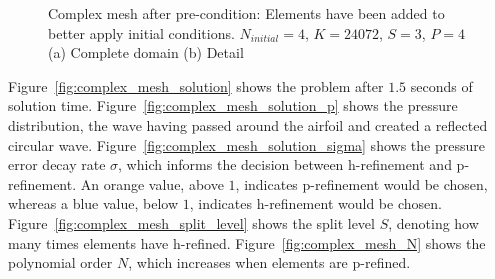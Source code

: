 \begin{figure}[H]
    \centering
    \hfill
    \caption{Complex mesh after pre-condition: Elements have been added to better apply initial 
        conditions. \(N_{initial} = 4\), \(K = 24072\), \(S = 3\), \(P = 4\) (a) Complete domain (b) 
        Detail}\label{fig:complex_mesh_pre_condition}
\end{figure}

Figure~\ref{fig:complex_mesh_solution} shows the problem after \(1.5\) seconds of solution time.
Figure~\ref{fig:complex_mesh_solution_p} shows the pressure distribution, the wave having passed
around the airfoil and created a reflected circular wave.
Figure~\ref{fig:complex_mesh_solution_sigma} shows the pressure error decay rate \(\sigma \), which
informs the decision between h-refinement and p-refinement. An orange value, above \(1\), indicates
p-refinement would be chosen, whereas a blue value, below \(1\), indicates h-refinement would be
chosen. Figure~\ref{fig:complex_mesh_split_level} shows the split level \(S\), denoting how many
times elements have h-refined. Figure~\ref{fig:complex_mesh_N} shows the polynomial order \(N\),
which increases when elements are p-refined.

